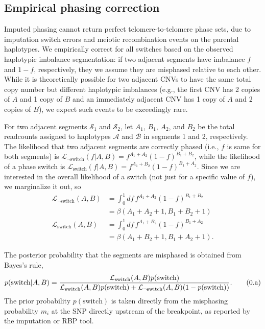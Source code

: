 \documentclass[10pt,letter]{article}
\numberwithin{equation}{section}
\newcommand{\btag}[1]{\addtocounter{equation}{1}\label{#1}\tag{\arabic{section}.\alph{equation}}}
\begin{document}
\subsection{Empirical phasing correction}

Imputed phasing cannot return perfect telomere-to-telomere phase sets, due to imputation switch errors and meiotic recombination events on the parental haplotypes. We empirically correct for all switches based on the observed haplotypic imbalance segmentation: if two adjacent segments have imbalance $f$ and $1-f$, respectively, they we assume they are misphased relative to each other. While it is theoretically possible for two adjacent CNVs to have the same total copy number but different haplotypic imbalances (e.g., the first CNV has 2 copies of $A$ and 1 copy of $B$ and an immediately adjacent CNV has 1 copy of $A$ and 2 copies of $B$), we expect such events to be exceedingly rare.

For two adjacent segments $\mathcal{S}_1$ and $\mathcal{S}_2$, let $A_1$, $B_1$, $A_2$, and $B_2$ be the total readcounts assigned to haplotypes $\mathcal A$ and $\mathcal B$ in segments 1 and 2, respectively. The likelihood that two adjacent segments are correctly phased (i.e., $f$ is same for both segments) is $\mathcal{L}_{\neg\text{switch}}(f|A,B)=f^{A_1+A_2}(1-f)^{B_1+B_2}$, while the likelihood of a phase switch is $\mathcal{L}_{\text{switch}}(f|A,B)=f^{A_1 + B_2}(1-f)^{B_1+A_2}$. Since we are interested in the overall likelihood of a switch (not just for a specific value of $f$), we marginalize it out, so
\begin{align*}
\mathcal{L}_{\neg\text{switch}}(A,B)&=\int_0^1 df\,f^{A_1+A_2}(1-f)^{B_1+B_2}\\
&=\beta(A_1+A_2+1,B_1+B_2+1)\\
\mathcal{L}_{\text{switch}}(A,B)&=\int_0^1 df\, f^{A_1 + B_2}(1-f)^{B_1+A_2}\\
&=\beta(A_1+B_2+1,B_1+A_2+1).
\end{align*}

The posterior probability that the segments are misphased is obtained from Bayes's rule,
\begin{align*}
p(\text{switch}|A,B) = \frac{\mathcal{L}_{\text{switch}}(A,B)p(\text{switch})}{\mathcal{L}_{\text{switch}}(A,B)p(\text{switch})+\mathcal{L}_{\neg\text{switch}}(A,B)(1-p(\text{switch}))}.\btag{pswitch}
\end{align*}
The prior probability $p(\text{switch})$ is taken directly from the misphasing probability $m_i$ at the SNP directly upstream of the breakpoint, as reported by the imputation or RBP tool.
\end{document}
